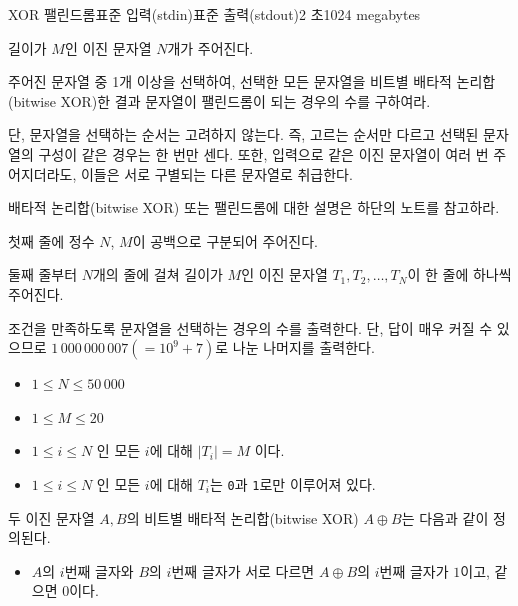 \def\probtitle{XOR 팰린드롬}
\def\probno{K} %

\begin{problem}{\probtitle}{표준 입력(stdin)}{표준 출력(stdout)}{2 초}{1024 megabytes}

길이가 $M$인 이진 문자열 $N$개가 주어진다.

주어진 문자열 중 1개 이상을 선택하여, 선택한 모든 문자열을 비트별 배타적 논리합(bitwise XOR)한 결과 문자열이 팰린드롬이 되는 경우의 수를 구하여라.

단, 문자열을 선택하는 순서는 고려하지 않는다. 즉, 고르는 순서만 다르고 선택된 문자열의 구성이 같은 경우는 한 번만 센다. 또한, 입력으로 같은 이진 문자열이 여러 번 주어지더라도, 이들은 서로 구별되는 다른 문자열로 취급한다.

배타적 논리합(bitwise XOR) 또는 팰린드롬에 대한 설명은 하단의 노트를 참고하라.

\InputFile

첫째 줄에 정수 $N$, $M$이 공백으로 구분되어 주어진다.

둘째 줄부터 $N$개의 줄에 걸쳐 길이가 $M$인 이진 문자열 $T_1, T_2, \dots, T_N$이 한 줄에 하나씩 주어진다.

\OutputFile

조건을 만족하도록 문자열을 선택하는 경우의 수를 출력한다. 단, 답이 매우 커질 수 있으므로 $1\, 000\, 000\, 007(=10^9+7)$로 나눈 나머지를 출력한다.

\Constraints

\begin{itemize}[topsep=0pt,noitemsep]
    \item $1 \le N \le 50\, 000$
    \item $1 \le M \le 20$
    \item $1 \le i \le N$ 인 모든 $i$에 대해 $|T_i| = M$ 이다.
    \item $1 \le i \le N$ 인 모든 $i$에 대해 $T_i$는 \texttt{0}과 \texttt{1}로만 이루어져 있다.
\end{itemize}

\Example

\begin{example}
\end{example}

\Notes

두 이진 문자열 $A, B$의 비트별 배타적 논리합(bitwise XOR) $A \oplus B$는 다음과 같이 정의된다.

\begin{itemize}[topsep=0pt,noitemsep] 
\item $A$의 $i$번째 글자와 $B$의 $i$번째 글자가 서로 다르면 $A \oplus B$의 $i$번째 글자가 $1$이고, 같으면 $0$이다.
\end{itemize}


\end{problem}
